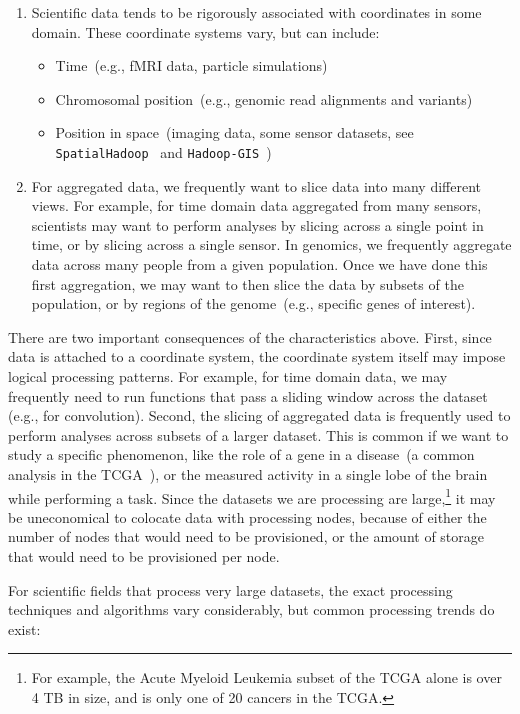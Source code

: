 \documentclass{acm_proc_article-sp}
\begin{document}
\begin{enumerate}
\item Scientific data tends to be rigorously associated with coordinates in some domain. These coordinate
systems vary, but can include:
\begin{itemize}
\item Time~(e.g., fMRI data, particle simulations)
\item Chromosomal position~(e.g., genomic read alignments and variants)
\item Position in space~(imaging data, some \linebreak sensor datasets, see \texttt{SpatialHadoop}~\cite{eldawy15}
and \texttt{Hadoop-GIS}~\cite{aji13})
\end{itemize}
\item For aggregated data, we frequently want to slice data into many different views. For example, for time
domain data aggregated from many sensors, scientists may want to perform analyses by slicing
across a single point in time, or by slicing across a single sensor. In genomics, we frequently aggregate data
across many people from a given population. Once we have done this first aggregation, we may want to then
slice the data by subsets of the population, or by regions of the genome~(e.g., specific genes of interest).
\end{enumerate}

There are two important consequences of the characteristics above. First, since data is attached to a
coordinate system, the coordinate system itself may impose logical processing patterns. For example, for
time domain data, we may frequently need to run functions that pass a sliding window across the dataset (e.g., for
convolution). Second, the slicing of aggregated data is frequently used to perform analyses across
subsets of a larger dataset. This is common if we want to study a specific phenomenon, like the role of a
gene in a disease~(a common analysis in the TCGA~\cite{weinstein13}), or the measured activity in a
single lobe of the brain while performing a task. Since the datasets we are processing are
large,\footnote{For example, the Acute Myeloid Leukemia subset of the TCGA alone is over 4 TB in size, and
is only one of 20 cancers in the TCGA.} it may be uneconomical to colocate data with processing nodes,
because of either the number of nodes that would need to be provisioned, or the amount of storage that would
need to be provisioned per node.

For scientific fields that process very large datasets, the exact processing techniques and algorithms vary
considerably, but common processing trends do exist:
\end{document}
